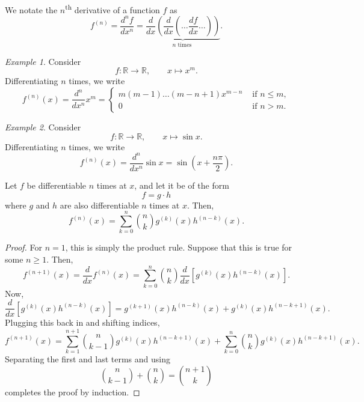 \documentclass[11pt]{article}
\def\R{\mathbb{R}}
\newcommand\ddx[1]{\frac{d #1}{d x}}
\newcommand\dd[3][]{\frac{d^{#1}{#2}}{d {#3}^{#1}}}
\theoremstyle{definition}
\theoremstyle{remark}
\newtheorem*{example}{Example}
\numberwithin{equation}{module}
\begin{document}
    \begin{definition}
        We notate the $n$\textsuperscript{th} derivative of a function $f$ as \[
            f^{(n)} = \dd[n]{f}{x} = \underbrace{\ddx{}\left(\ddx{}\left(\dots
            \ddx{f}\dots\right)\right)}_{n\text{ times }}.
        \] 
    \end{definition}
    \begin{example}
        Consider \[
            f\colon \R \to \R, \qquad x \mapsto x^m.
        \] Differentiating $n$ times, we write \[
            f^{(n)}(x) = \dd[n]{}{x}x^m = \begin{cases}
                m(m - 1)\dots(m - n + 1) x^{m - n} &\text{ if } n \leq m, \\
                0 &\text{ if } n > m.
            \end{cases}
        \] 
    \end{example}
    \begin{example}
        Consider \[
            f\colon \R \to \R, \qquad x \mapsto \sin{x}.
        \] Differentiating $n$ times, we write \[
            f^{(n)}(x) = \dd[n]{}{x}\sin{x} = \sin\left(x + \frac{n\pi}{2}\right).
        \] 
    \end{example}
    \begin{theorem}
        Let $f$ be differentiable $n$ times at $x$, and let it be of the form \[
            f = g\cdot h
        \] where $g$ and $h$ are also differentiable $n$ times at $x$. Then, \[
            f^{(n)}(x) = \sum_{k = 0}^n \binom{n}{k}g^{(k)}(x)h^{(n - k)}(x).
        \] 
    \end{theorem}
    \begin{proof}
        For $n = 1$, this is simply the product rule. Suppose that this is true for
        some $n \geq 1$. Then, \[
            f^{(n + 1)}(x) = \ddx{}f^{(n)}(x) = \sum_{k = 0}^n
            \binom{n}{k}\ddx{}\left[g^{(k)}(x)h^{(n - k)}(x)\right].
        \] Now, \[
            \ddx{}\left[g^{(k)}(x)h^{(n - k)}(x)\right] = g^{(k + 1)}(x)h^{(n -
            k)}(x) + g^{(k)}(x)h^{(n - k + 1)}(x).
        \] Plugging this back in and shifting indices, \[
            f^{(n + 1)}(x) = \sum_{k = 1}^{n + 1} \binom{n}{k -
            1}g^{(k)}(x)h^{(n - k + 1)}(x) + \sum_{k = 0}^{n} \binom{n}{k}
            g^{(k)}(x)h^{(n - k + 1)}(x).
        \] Separating the first and last terms and using \[
            \binom{n}{k - 1} + \binom{n}{k} = \binom{n + 1}{k}
        \] completes the proof by induction.
    \end{proof}
\end{document}
